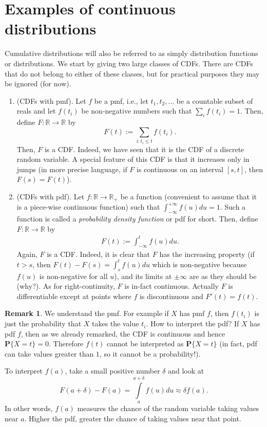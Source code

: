 \documentclass[preprint,  11pt]{amsart}
\theoremstyle{plain} %
\theoremstyle{definition} %
\newtheorem{remark}[theorem]{Remark}
\begin{document}
\section{Examples of continuous distributions}
Cumulative distributions will also be referred to as simply distribution functions or distributions. We start by giving two large classes of CDFs. There are CDFs that do not belong to either of these classes, but for practical purposes they may be ignored (for now).
\begin{enumerate}\setlength\itemsep{6pt}
\item (CDFs with pmf). Let $f$ be a pmf, i.e., let $t_{1},t_{2},\ldots$ be a countable subset of reals and let $f(t_{i})$ be non-negative numbers such that $\sum_{i}f(t_{i})=1$. Then,  define $F:\mathbb{R}\rightarrow \mathbb{R}$ by
$$
 F(t) := \sum_{i: t_{i}\le t}f(t_{i}).
$$
Then, $F$ is a CDF. Indeed, we have seen that it is the CDF of a discrete random variable. A special feature of this CDF is that it increases only in jumps (in more precise language, if $F$ is continuous on an interval $[s,t]$, then $F(s)=F(t)$).
\item (CDFs with pdf). Let $f:\mathbb{R}\rightarrow\mathbb{R}_{+}$ be a  function (convenient to assume that it is a piece-wise continuous function) such that $\int_{-\infty}^{+\infty}f(u)du=1$. Such a function is called a {\em probability density function} or pdf for short.  Then,  define $F:\mathbb{R}\rightarrow \mathbb{R}$ by
\[\begin{aligned}
F(t) :=\int_{-\infty}^{t}f(u) du.
\end{aligned}\]
Again, $F$ is a CDF. Indeed, it is clear that $F$ has the increasing property (if $t>s$, then $F(t)-F(s)=\int_{s}^{t}f(u)du$ which is non-negative because $f(u)$ is non-negative for all $u$), and its limits at $\pm \infty$ are as they should be (why?). As for right-continuity, $F$ is in-fact continuous. Actually $F$ is differentiable except at points where $f$ is discontinuous and $F'(t)=f(t)$.
\end{enumerate}

\begin{remark} We understand the pmf. For example if $X$ has pmf $f$, then $f(t_{i})$ is just the probability that $X$ takes the value $t_{i}$. How to interpret the pdf? If $X$ has pdf $f$, then as we already remarked, the CDF is continuous and hence $\mathbf{P}\{X=t\}=0$. Therefore $f(t)$ cannot be interpreted as $\mathbf{P}\{X=t\}$ (in fact, pdf can take values greater than $1$, so it cannot be a probability!).

To interpret $f(a)$, take a small positive number $\delta$ and look at  
$$
F(a+\delta)-F(a)  = \int\limits_{a}^{a+\delta}f(u) du \approx \delta f(a).
$$
 In other words, $f(a)$ measures the chance of the random variable taking values near $a$. Higher the pdf, greater the chance of taking values near that point.
\end{remark}
\end{document}
